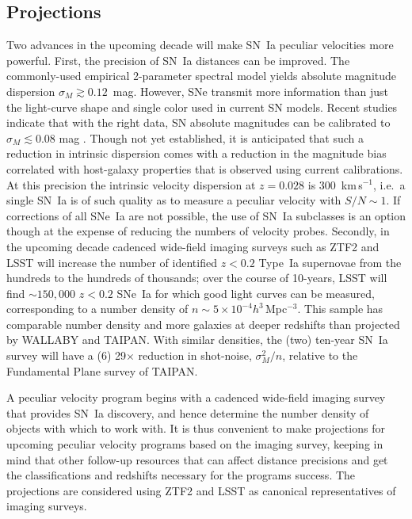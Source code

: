 \documentclass[11pt, oneside]{article}   	%
\begin{document}
\subsection{Projections}
Two advances in the upcoming decade will make SN~Ia peculiar velocities more powerful.
First, the precision of SN~Ia distances can be improved.  The commonly-used empirical 2-parameter spectral model yields  absolute magnitude
dispersion $\sigma_M \gtrsim 0.12$~mag.  However, SNe transmit more information than just the light-curve shape and single color used in current SN models.
Recent studies indicate that with the right data, SN absolute
magnitudes can be calibrated to $\sigma_M \lesssim 0.08$ mag \cite[see e.g.][]{2012MNRAS.425.1007B, 2015ApJ...815...58F}. 
Though not yet
established, it is anticipated that such a reduction in intrinsic dispersion comes with a reduction in the magnitude bias correlated with host-galaxy properties
that is observed using current calibrations.  At this precision the intrinsic velocity dispersion  at $z=0.028$ is  $300$~km\,s$^{-1}$, i.e.\ a single SN~Ia  is of such quality as to
measure a peculiar velocity with $S/N \sim 1$.
 If corrections of all SNe~Ia are not possible, the use of SN~Ia subclasses is an option though at the expense of reducing the
numbers of velocity probes.
Secondly,  in the upcoming decade cadenced wide-field imaging surveys such as ZTF2 and LSST
  will increase the number of identified  $z<0.2$ Type~Ia supernovae from the hundreds to the
hundreds of thousands; over the course of 10-years, LSST will find $\sim150,000$ $z<0.2$ SNe~Ia
 for which good light curves can be measured, corresponding to a  number density of $n \sim 5\times 10^{-4}h^3$\,Mpc$^{-3}$.
  This sample has comparable
 number density and more galaxies at deeper redshifts than projected by WALLABY and TAIPAN.  With similar densities,
 the (two) ten-year SN~Ia survey will have
 a (6) 29$\times$ reduction in shot-noise, $\sigma^2_M/n$, relative to the Fundamental Plane survey of TAIPAN.

A peculiar velocity program begins with a cadenced wide-field imaging survey that provides SN~Ia discovery, and hence 
determine the number
density of objects with which to work with.    
It is thus convenient to make projections for upcoming peculiar velocity programs
based on the imaging survey, keeping in mind that other follow-up resources that can affect distance precisions and 
get the classifications and redshifts
necessary for the programs success.  The projections are considered using ZTF2 and LSST 
as canonical representatives of imaging surveys.
\end{document}
